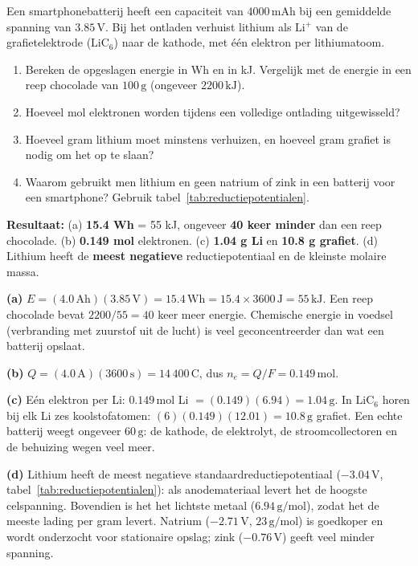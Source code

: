 \begin{oefening}\label{oef:smartphonebatterij}
Een smartphonebatterij heeft een capaciteit van \(4000\,\mathrm{mAh}\) bij een gemiddelde spanning van \(3.85\,\mathrm{V}\). Bij het ontladen verhuist lithium als \(\mathrm{Li^+}\) van de grafietelektrode (\(\mathrm{LiC_6}\)) naar de kathode, met één elektron per lithiumatoom.

\begin{enumerate}
\item[(a)]
  Bereken de opgeslagen energie in Wh en in kJ. Vergelijk met de energie in een reep chocolade van \(100\,\mathrm{g}\) (ongeveer \(2200\,\mathrm{kJ}\)).
\item[(b)]
  Hoeveel mol elektronen worden tijdens een volledige ontlading uitgewisseld?
\item[(c)]
  Hoeveel gram lithium moet minstens verhuizen, en hoeveel gram grafiet is nodig om het op te slaan?
\item[(d)]
  Waarom gebruikt men lithium en geen natrium of zink in een batterij voor een smartphone? Gebruik tabel~\ref{tab:reductiepotentialen}.
\end{enumerate}
\end{oefening}
\begin{oplossing}
\textbf{Resultaat:} (a) \textbf{15.4 Wh} = 55 kJ, ongeveer \textbf{40 keer minder} dan een reep chocolade. (b) \textbf{0.149 mol} elektronen. (c) \textbf{1.04 g Li} en \textbf{10.8 g grafiet}. (d) Lithium heeft de \textbf{meest negatieve} reductiepotentiaal en de kleinste molaire massa.

\textbf{(a)} \(E = (4.0\,\mathrm{Ah})(3.85\,\mathrm{V}) = 15.4\,\mathrm{Wh} = 15.4 \times 3600\,\mathrm{J} = 55\,\mathrm{kJ}\). Een reep chocolade bevat \(2200/55 = 40\) keer meer energie. Chemische energie in voedsel (verbranding met zuurstof uit de lucht) is veel geconcentreerder dan wat een batterij opslaat.

\textbf{(b)} \(Q = (4.0\,\mathrm{A})(3600\,\mathrm{s}) = 14\,400\,\mathrm{C}\), dus \(n_e = Q/F = 0.149\,\mathrm{mol}\).

\textbf{(c)} Eén elektron per Li: \(0.149\,\mathrm{mol}\) Li \(= (0.149)(6.94) = 1.04\,\mathrm{g}\). In \(\mathrm{LiC_6}\) horen bij elk Li zes koolstofatomen: \((6)(0.149)(12.01) = 10.8\,\mathrm{g}\) grafiet. Een echte batterij weegt ongeveer \(60\,\mathrm{g}\): de kathode, de elektrolyt, de stroomcollectoren en de behuizing wegen veel meer.

\textbf{(d)} Lithium heeft de meest negatieve standaardreductiepotentiaal (\(-3.04\,\mathrm{V}\), tabel~\ref{tab:reductiepotentialen}): als anodemateriaal levert het de hoogste celspanning. Bovendien is het het lichtste metaal (\(6.94\,\mathrm{g/mol}\)), zodat het de meeste lading per gram levert. Natrium (\(-2.71\,\mathrm{V}\), \(23\,\mathrm{g/mol}\)) is goedkoper en wordt onderzocht voor stationaire opslag; zink (\(-0.76\,\mathrm{V}\)) geeft veel minder spanning.
\end{oplossing}

